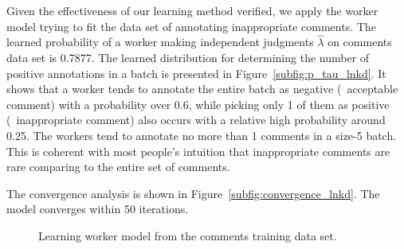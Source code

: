 Given the effectiveness of our learning method verified, 
we apply the worker model trying to fit the data set of annotating inappropriate comments.  
The learned probability of a worker making independent judgments $\hat{\lambda}$ on comments data set is 0.7877.  
The learned distribution for determining the number of positive annotations in a batch is presented in Figure~\ref{subfig:p_tau_lnkd}.  
It shows that a worker tends to annotate the entire batch as negative (\ie~acceptable comment) with a probability over 0.6, 
while picking only 1 of them as positive (\ie~inappropriate comment) also occurs with a relative high probability around 0.25.  
The workers tend to annotate no more than 1 comments in a size-5 batch.  
This is coherent with most people's intuition that inappropriate comments are rare comparing to the entire set of comments.  

The convergence analysis is shown in Figure~\ref{subfig:convergence_lnkd}.  
The model converges within 50 iterations.  


\begin{figure}[!t]
  \centering
  \caption{\label{fig:lnkd_training}
  Learning worker model from the comments training data set.
  }
  \vspace{-0.2in}
\end{figure}



